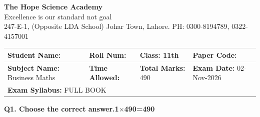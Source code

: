 \documentclass[11pt,a4paper]{article}
\begin{document}
\begin{center}
  {\Huge\bfseries The Hope Science Academy}\\[3pt]
  {\small Excellence is our standard not goal}\\[2pt]
  {\small 247-E-1, (Opposite LDA School) Johar Town, Lahore. PH: 0300-8194789, 0322-4157001}
\end{center}

\medskip
\noindent
\begin{tabularx}{\linewidth}{|X|X|X|X|}
\hline
\textbf{Student Name:} & \textbf{Roll Num:} & \textbf{Class:} 11th & \textbf{Paper Code:} \\ \hline
\textbf{Subject Name:} Business Maths & \textbf{Time Allowed:} & \textbf{Total Marks:} 490 & \textbf{Exam Date:} 02-Nov-2026 \\ \hline
\multicolumn{4}{|l|}{\textbf{Exam Syllabus:} FULL BOOK} \\ \hline
\end{tabularx}

\bigskip
\noindent\textbf{Q1. Choose the correct answer.}\hfill\textbf{1$\times$490=490}
\end{document}

